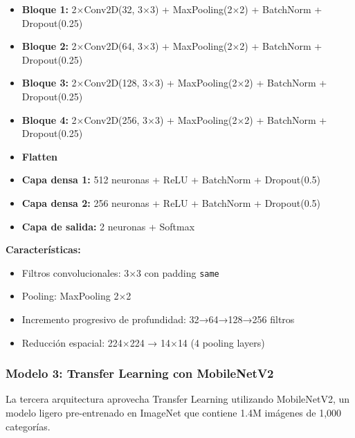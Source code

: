 \documentclass[11pt, a4paper]{article}
\begin{document}
\begin{itemize}
    \item \textbf{Bloque 1:} 2$\times$Conv2D(32, 3$\times$3) + MaxPooling(2$\times$2) + BatchNorm + Dropout(0.25)
    \item \textbf{Bloque 2:} 2$\times$Conv2D(64, 3$\times$3) + MaxPooling(2$\times$2) + BatchNorm + Dropout(0.25)
    \item \textbf{Bloque 3:} 2$\times$Conv2D(128, 3$\times$3) + MaxPooling(2$\times$2) + BatchNorm + Dropout(0.25)
    \item \textbf{Bloque 4:} 2$\times$Conv2D(256, 3$\times$3) + MaxPooling(2$\times$2) + BatchNorm + Dropout(0.25)
    \item \textbf{Flatten}
    \item \textbf{Capa densa 1:} 512 neuronas + ReLU + BatchNorm + Dropout(0.5)
    \item \textbf{Capa densa 2:} 256 neuronas + ReLU + BatchNorm + Dropout(0.5)
    \item \textbf{Capa de salida:} 2 neuronas + Softmax
\end{itemize}

\textbf{Características:}
\begin{itemize}
    \item Filtros convolucionales: 3$\times$3 con padding \texttt{same}
    \item Pooling: MaxPooling 2$\times$2
    \item Incremento progresivo de profundidad: 32→64→128→256 filtros
    \item Reducción espacial: 224$\times$224 → 14$\times$14 (4 pooling layers)
\end{itemize}

\subsubsection{Modelo 3: Transfer Learning con MobileNetV2}

La tercera arquitectura aprovecha Transfer Learning utilizando MobileNetV2, un modelo ligero pre-entrenado en ImageNet que contiene 1.4M imágenes de 1,000 categorías.
\end{document}
